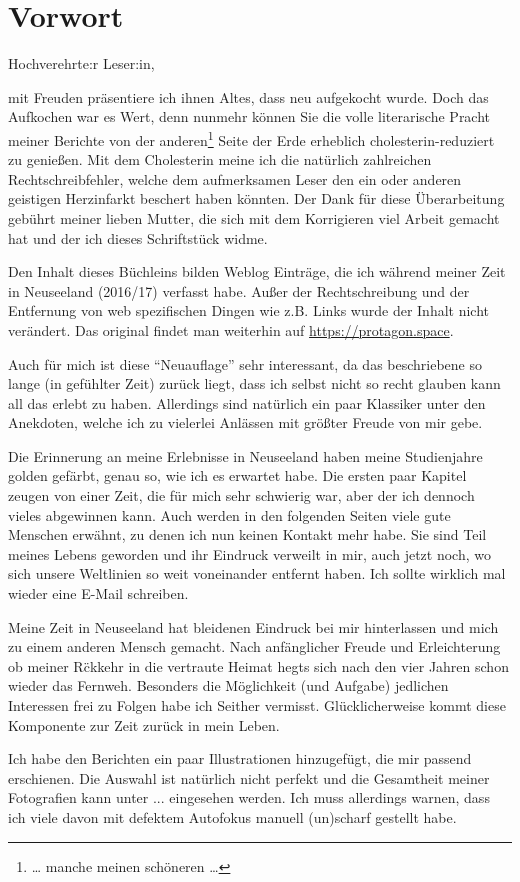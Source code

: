 \chapter*{Vorwort}

Hochverehrte:r Leser:in,

mit Freuden präsentiere ich ihnen Altes, dass neu aufgekocht wurde.
Doch das Aufkochen war es Wert, denn nunmehr können Sie die volle
literarische Pracht meiner Berichte von der anderen\footnote{\ldots{}
  manche meinen schöneren \ldots{}} Seite der Erde erheblich
cholesterin-reduziert zu genießen. Mit dem Cholesterin meine ich die
natürlich zahlreichen Rechtschreibfehler, welche dem aufmerksamen
Leser den ein oder anderen geistigen Herzinfarkt beschert haben
könnten. Der Dank für diese Überarbeitung gebührt meiner lieben
Mutter, die sich mit dem Korrigieren viel Arbeit gemacht hat und der
ich dieses Schriftstück widme.

Den Inhalt dieses Büchleins bilden Weblog Einträge, die ich während
meiner Zeit in Neuseeland (2016/17) verfasst habe. Außer der
Rechtschreibung und der Entfernung von web spezifischen Dingen wie
z.B. Links wurde der Inhalt nicht verändert. Das original findet man
weiterhin auf \url{https://protagon.space}.


Auch für mich ist diese ``Neuauflage'' sehr interessant, da das
beschriebene so lange (in gefühlter Zeit) zurück liegt, dass ich
selbst nicht so recht glauben kann all das erlebt zu haben. Allerdings
sind natürlich ein paar Klassiker unter den Anekdoten, welche ich zu
vielerlei Anlässen mit größter Freude von mir gebe.

Die Erinnerung an meine Erlebnisse in Neuseeland haben meine
Studienjahre golden gefärbt, genau so, wie ich es erwartet habe. Die
ersten paar Kapitel zeugen von einer Zeit, die für mich sehr schwierig
war, aber der ich dennoch vieles abgewinnen kann.  Auch werden in den
folgenden Seiten viele gute Menschen erwähnt, zu denen ich nun keinen
Kontakt mehr habe. Sie sind Teil meines Lebens geworden und ihr
Eindruck verweilt in mir, auch jetzt noch, wo sich unsere Weltlinien
so weit voneinander entfernt haben. Ich sollte wirklich mal wieder
eine E-Mail schreiben.

Meine Zeit in Neuseeland hat bleidenen Eindruck bei mir hinterlassen
und mich zu einem anderen Mensch gemacht. Nach anf\"anglicher Freude
und Erleichterung ob meiner R\"ckkehr in die vertraute Heimat hegts
sich nach den vier Jahren schon wieder das Fernweh. Besonders die
M\"oglichkeit (und Aufgabe) jedlichen Interessen frei zu Folgen habe
ich Seither vermisst. Gl\"ucklicherweise kommt diese Komponente zur
Zeit zur\"uck in mein Leben.

Ich habe den Berichten ein paar Illustrationen hinzugefügt, die mir
passend erschienen. Die Auswahl ist natürlich nicht perfekt und die
Gesamtheit meiner Fotografien kann unter ... eingesehen werden.
Ich muss allerdings warnen, dass ich viele davon mit defektem
Autofokus manuell (un)scharf gestellt habe.

